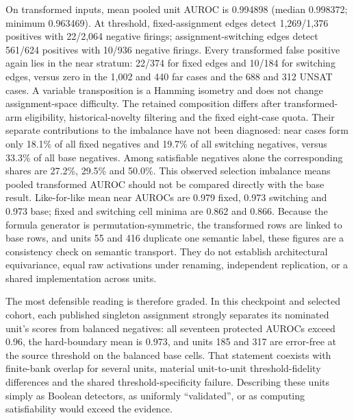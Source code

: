 \documentclass[
  british,
  11pt,
  a4paper,
]{article}
\begin{document}
On transformed inputs, mean pooled unit AUROC is 0.994898 (median
0.998372; minimum 0.963469). At threshold, fixed-assignment edges detect
1,269/1,376 positives with 22/2,064 negative firings;
assignment-switching edges detect 561/624 positives with 10/936 negative
firings. Every transformed false positive again lies in the near
stratum: 22/374 for fixed edges and 10/184 for switching edges, versus
zero in the 1,002 and 440 far cases and the 688 and 312 UNSAT cases. A
variable transposition is a Hamming isometry and does not change
assignment-space difficulty. The retained composition differs after
transformed-arm eligibility, historical-novelty filtering and the fixed
eight-case quota. Their separate contributions to the imbalance have not
been diagnosed: near cases form only 18.1\% of all fixed negatives and
19.7\% of all switching negatives, versus 33.3\% of all base negatives.
Among satisfiable negatives alone the corresponding shares are 27.2\%,
29.5\% and 50.0\%. This observed selection imbalance means pooled
transformed AUROC should not be compared directly with the base result.
Like-for-like mean near AUROCs are 0.979 fixed, 0.973 switching and
0.973 base; fixed and switching cell minima are 0.862 and 0.866. Because
the formula generator is permutation-symmetric, the transformed rows are
linked to base rows, and units 55 and 416 duplicate one semantic label,
these figures are a consistency check on semantic transport. They do not
establish architectural equivariance, equal raw activations under
renaming, independent replication, or a shared implementation across
units.

The most defensible reading is therefore graded. In this checkpoint and
selected cohort, each published singleton assignment strongly separates
its nominated unit's scores from balanced negatives: all seventeen
protected AUROCs exceed 0.96, the hard-boundary mean is 0.973, and units
185 and 317 are error-free at the source threshold on the balanced base
cells. That statement coexists with finite-bank overlap for several
units, material unit-to-unit threshold-fidelity differences and the
shared threshold-specificity failure. Describing these units simply as
Boolean detectors, as uniformly ``validated'', or as computing
satisfiability would exceed the evidence.
\end{document}
